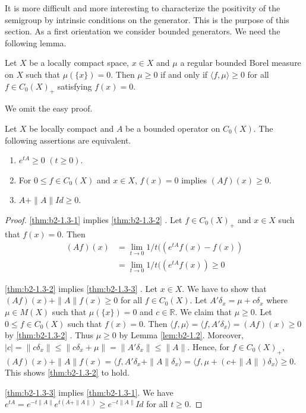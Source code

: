 It is more difficult and more interesting to characterize the positivity of the semigroup by intrinsic conditions on the generator.
This is the purpose of this section.
As a first orientation we consider bounded generators.
We need the following lemma.
\begin{lemma}\label{lem:b2-1.2}
Let $X$ be a locally compact space, $x \in X$ and $\mu$ a regular bounded Borel measure on $X$ such that $\mu(\{x\}) = 0$.
Then $\mu \geq 0$ if and only if $\langle f,\mu \rangle \geq 0$ for all $f \in C_{0}(X)_{+}$ satisfying $f(x) = 0$.
\end{lemma}

We omit the easy proof.

\begin{theorem}\label{thm:b2-1.3}
Let $X$ be locally compact and $A$ be a bounded operator on $C_{0}(X)$.
The following assertions are equivalent.
\begin{enumerate}[\upshape (a)]
\item \label{thm:b2-1.3-1}
$e^{tA} \geq 0$ $(t \geq 0)$.
\item \label{thm:b2-1.3-2}
For $0 \leq f \in C_{0}(X)$ and $x \in X$, $f(x) = 0$ implies $(Af)(x) \geq 0$.
\item \label{thm:b2-1.3-3}
$A + \|A\|Id \geq 0$.
\end{enumerate}
\end{theorem}

\begin{proof}
\ref{thm:b2-1.3-1} implies \ref{thm:b2-1.3-2} .
Let $f \in C_{0}(X)_{+}$ and $x \in X$ such that $f(x) = 0$.
Then
\begin{align*}
(Af)(x) &= \lim_{t \to 0} 1/t ((e^{tA}f(x) - f(x)) \\
&= \lim_{t \to 0} 1/t ((e^{tA}f(x)) \geq 0
\end{align*}

\ref{thm:b2-1.3-2} implies \ref{thm:b2-1.3-3} .
Let $x \in X$.
We have to show that $(Af)(x) + \|A\|f(x) \geq 0$ for all $f \in C_{0}(X)$.
Let $A'\delta_{x} = \mu + c\delta_{x}$ where $\mu \in M(X)$ such that $\mu(\{x\}) = 0$ and $c \in \mathbb{R}$.
We claim that $\mu \geq 0$.
Let $0 \leq f \in C_{0}(X)$ such that $f(x) = 0$.
Then $\langle f,\mu \rangle = \langle f,A'\delta_{x} \rangle = (Af)(x) \geq 0$ by \ref{thm:b2-1.3-2} .
Thus $\mu \geq 0$ by Lemma \ref{lem:b2-1.2}.
Moreover, $|c| = \|c\delta_{x}\| \leq \|c\delta_{x} + \mu\| = \|A'\delta_{x}\| \leq \|A\|$.
Hence, for $f \in C_{0}(X)_{+}$,
$(Af)(x) + \|A\|f(x) = \langle f, A'\delta_{x} + \|A\|\delta_{x} \rangle = \langle f, \mu + (c+\|A\|)\delta_{x} \rangle \geq 0$.
This shows  \ref{thm:b2-1.3-2} to hold.

\ref{thm:b2-1.3-3} implies \ref{thm:b2-1.3-1}.
We have 
$e^{tA} = e^{-t\|A\|}e^{t(A+\|A\|)} \geq e^{-t\|A\|}Id$ for all $t \geq 0$.
\end{proof}

